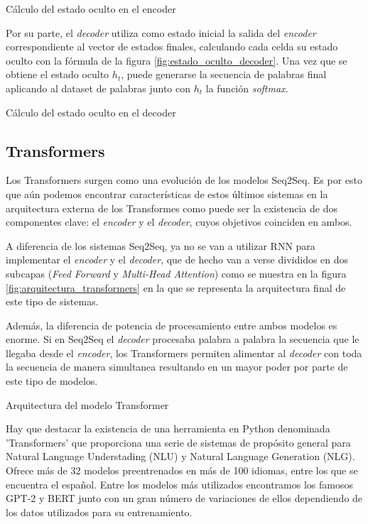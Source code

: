 %
{Cálculo del estado oculto en el encoder}

Por su parte, el \textit{decoder} utiliza como estado inicial la salida del \textit{encoder} correspondiente al vector de estados finales, calculando cada celda su estado oculto con la fórmula de la figura \ref{fig:estado_oculto_decoder}. Una vez que se obtiene el estado oculto $h_{t}$, puede generarse la secuencia de palabras final aplicando al dataset de palabras junto con $h_{t}$ la función \textit{softmax}.

%
{Cálculo del estado oculto en el decoder}

\subsection{Transformers} 
Los Transformers surgen como una evolución de los modelos Seq2Seq. Es por esto que aún podemos encontrar características de estos últimos sistemas en la arquitectura externa de los Transformes como puede ser la existencia de dos componentes clave: el \textit{encoder} y el \textit{decoder}, cuyos objetivos coinciden en ambos.

A diferencia de los sistemas Seq2Seq, ya no se van a utilizar RNN para implementar el \textit{encoder} y el \textit{decoder}, que de hecho van a verse divididos en dos subcapas (\textit{Feed Forward} y \textit{Multi-Head Attention}) como se muestra en la figura \ref{fig:arquitectura_transformers} en la que se representa la arquitectura final de este tipo de sistemas.

Además, la diferencia de potencia de procesamiento entre ambos modelos es enorme. Si en Seq2Seq el \textit{decoder} procesaba palabra a palabra la secuencia que le llegaba desde el \textit{encoder}, los Transformers permiten alimentar al \textit{decoder} con toda la secuencia de manera simultanea resultando en un mayor poder por parte de este tipo de modelos.

%
{Arquitectura del modelo Transformer}

Hay que destacar la existencia de una herramienta en Python denominada 'Transformers' que proporciona una serie de sistemas de propósito general para Natural Language Understading (NLU) y Natural Language Generation (NLG). Ofrece más de 32 modelos preentrenados en más de 100 idiomas, entre los que se encuentra el español. Entre los modelos más utilizados encontramos los famosos GPT-2 y BERT junto con un gran número de variaciones de ellos dependiendo de los datos utilizados para su entrenamiento.

